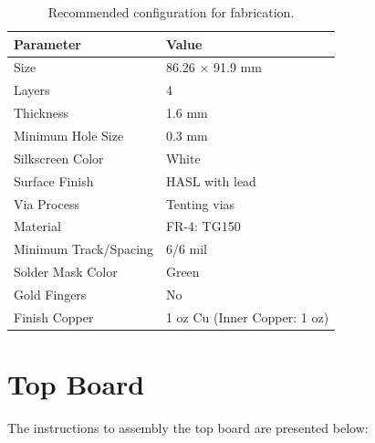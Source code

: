 \begin{table}[!h]
    \centering
    \begin{tabular}{L{0.5\columnwidth}L{0.5\columnwidth}}
        \toprule[1.5pt]
        \textbf{Parameter}      & \textbf{Value} \\
        \midrule
        Size                    & 86.26 $\times$ 91.9 mm \\
        Layers                  & 4 \\
        Thickness               & 1.6 mm \\
        Minimum Hole Size       & 0.3 mm \\
        Silkscreen Color        & White \\
        Surface Finish          & HASL with lead \\
        Via Process             & Tenting vias \\
        Material                & FR-4: TG150 \\
        Minimum Track/Spacing   & 6/6 mil \\
        Solder Mask Color       & Green \\
        Gold Fingers            & No \\
        Finish Copper           & 1 oz Cu (Inner Copper: 1 oz) \\
        \bottomrule[1.5pt]
    \end{tabular}
    \caption{Recommended configuration for fabrication.}
    \label{tab:pcb-fabrication}
\end{table}

\section{Top Board}

The instructions to assembly the top board are presented below:

